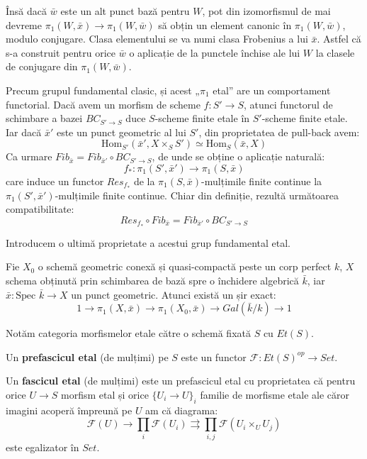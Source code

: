 \documentclass[13pt,openany]{book}
\begin{document}
Însă dacă $\bar{w}$ este un alt punct bază pentru $W$, pot din izomorfismul de mai devreme $ \pi_1(W,\bar{x}) \rightarrow \pi_1(W,\bar{w})$ să obțin un element canonic în $\pi_1(W,\bar{w})$, modulo conjugare. Clasa elementului se va numi clasa Frobenius a lui $\bar{x}$. Astfel că s-a construit pentru orice $\bar{w}$ o aplicație de la punctele închise ale lui $W$ la clasele de conjugare din $\pi_1(W,\bar{w})$.

Precum grupul fundamental clasic, și acest „$\pi_1$ etal” are un comportament functorial. Dacă avem un morfism de scheme $f: S' \rightarrow S$, atunci functorul de schimbare a bazei $BC_{S'\rightarrow S}$ duce $S$-scheme finite etale în $S'$-scheme finite etale. Iar dacă $\bar{x}'$ este un punct geometric al lui $S'$, din proprietatea de pull-back avem:
$$\text{Hom}_{S'}(\bar{x}',X \times_S S')\simeq \text{Hom}_S(\bar{x},X)$$
Ca urmare $Fib_{\bar{x}} = Fib_{\bar{x}'} \circ BC_{S'\rightarrow S}$, de unde se obține o aplicație naturală:
$$f_* : \pi_1(S',\bar{x}') \rightarrow \pi_1(S,\bar{x})$$
care induce un functor $Res_{f_*}$ de la $\pi_1(S,\bar{x})$-mulțimile finite continue la $\pi_1(S',\bar{x}')$-mulțimile finite continue. Chiar din definiție, rezultă următoarea compatibilitate:
$$Res_{f_*} \circ Fib_{\bar{x}} = Fib_{\bar{x}'} \circ BC_{S'\rightarrow S}$$

Introducem o ultimă proprietate a acestui grup fundamental etal.

\begin{teo}
Fie $X_0$ o schemă geometric conexă și quasi-compactă peste un corp perfect $k$, $X$ schema obținută prin schimbarea de bază spre o închidere algebrică $\bar{k}$, iar $\bar{x} : \text{Spec }\bar{k} \rightarrow X$ un punct geometric. Atunci există un șir exact:
$$1 \rightarrow \pi_1(X,\bar{x}) \rightarrow \pi_1(X_0,\bar{x}) \rightarrow Gal(\bar{k}/k) \rightarrow 1$$
\end{teo}

Notăm categoria morfismelor etale către o schemă fixată $S$ cu $Et(S)$.

\begin{defi}
Un {\bf prefascicul etal} (de mulțimi) pe $S$ este un functor $\mathcal{F} : Et(S)^{op} \rightarrow Set$.
\end{defi}

\begin{defi}
Un {\bf fascicul etal} (de mulțimi) este un prefascicul etal cu proprietatea că pentru orice $U \rightarrow S$ morfism etal și orice $\{U_i \rightarrow U\}_i$ familie de morfisme etale ale căror imagini acoperă împreună pe $U$ am că diagrama:
$$\mathcal{F}(U) \rightarrow \prod_i \mathcal{F}(U_i) \rightrightarrows \prod_{i,j} \mathcal{F}(U_i \times_U U_j)$$
este egalizator în $Set$.
\end{defi}
\end{document}
